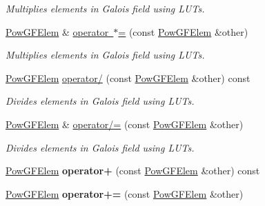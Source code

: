 \begin{DoxyCompactItemize}
\begin{DoxyCompactList}\small\item\em Multiplies elements in Galois field using L\+U\+Ts. \end{DoxyCompactList}\item 
\mbox{\hyperlink{class_g_flinalg_1_1_pow_g_f_elem}{Pow\+G\+F\+Elem}} \& \mbox{\hyperlink{class_g_flinalg_1_1_pow_g_f_elem_ad7ede876f4be2e83996635958b727bf9}{operator $\ast$=}} (const \mbox{\hyperlink{class_g_flinalg_1_1_pow_g_f_elem}{Pow\+G\+F\+Elem}} \&other)
\begin{DoxyCompactList}\small\item\em Multiplies elements in Galois field using L\+U\+Ts. \end{DoxyCompactList}\item 
\mbox{\hyperlink{class_g_flinalg_1_1_pow_g_f_elem}{Pow\+G\+F\+Elem}} \mbox{\hyperlink{class_g_flinalg_1_1_pow_g_f_elem_adfd3e4e39bf157091a3563bfb401a674}{operator/}} (const \mbox{\hyperlink{class_g_flinalg_1_1_pow_g_f_elem}{Pow\+G\+F\+Elem}} \&other) const
\begin{DoxyCompactList}\small\item\em Divides elements in Galois field using L\+U\+Ts. \end{DoxyCompactList}\item 
\mbox{\hyperlink{class_g_flinalg_1_1_pow_g_f_elem}{Pow\+G\+F\+Elem}} \& \mbox{\hyperlink{class_g_flinalg_1_1_pow_g_f_elem_a515c0c03a9aeb77786ad760f9e0672ae}{operator/=}} (const \mbox{\hyperlink{class_g_flinalg_1_1_pow_g_f_elem}{Pow\+G\+F\+Elem}} \&other)
\begin{DoxyCompactList}\small\item\em Divides elements in Galois field using L\+U\+Ts. \end{DoxyCompactList}\item 
\mbox{\label{class_g_flinalg_1_1_pow_g_f_elem_ad2ff2479970da54c0199d536a2848dea}} 
\mbox{\hyperlink{class_g_flinalg_1_1_pow_g_f_elem}{Pow\+G\+F\+Elem}} {\bfseries operator+} (const \mbox{\hyperlink{class_g_flinalg_1_1_pow_g_f_elem}{Pow\+G\+F\+Elem}} \&other) const
\item 
\mbox{\label{class_g_flinalg_1_1_pow_g_f_elem_a7f3e7c8f4a990a8b5f1877fae67684cb}} 
\mbox{\hyperlink{class_g_flinalg_1_1_pow_g_f_elem}{Pow\+G\+F\+Elem}} {\bfseries operator+=} (const \mbox{\hyperlink{class_g_flinalg_1_1_pow_g_f_elem}{Pow\+G\+F\+Elem}} \&other)
\end{DoxyCompactItemize}
